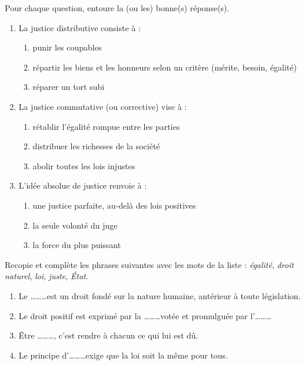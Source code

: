 \documentclass[11pt]{article}
\begin{document}
\begin{exercice}[QCM]
Pour chaque question, entoure la (ou les) bonne(s) réponse(s).
\begin{enumerate}
  \item La justice distributive consiste à :
  \begin{enumerate}
    \item[a)] punir les coupables
    \item[b)] répartir les biens et les honneurs selon un critère (mérite, besoin, égalité)
    \item[c)] réparer un tort subi
  \end{enumerate}
  \item La justice commutative (ou corrective) vise à :
  \begin{enumerate}
    \item[a)] rétablir l'égalité rompue entre les parties
    \item[b)] distribuer les richesses de la société
    \item[c)] abolir toutes les lois injustes
  \end{enumerate}
  \item L'idée absolue de justice renvoie à :
  \begin{enumerate}
    \item[a)] une justice parfaite, au-delà des lois positives
    \item[b)] la seule volonté du juge
    \item[c)] la force du plus puissant
  \end{enumerate}
\end{enumerate}
\end{exercice}

\begin{exercice}[Complétion]
Recopie et complète les phrases suivantes avec les mots de la liste : \emph{égalité}, \emph{droit naturel}, \emph{loi}, \emph{juste}, \emph{État}.
\begin{enumerate}
  \item Le \ldots\ldots\ldots est un droit fondé sur la nature humaine, antérieur à toute législation.
  \item Le droit positif est exprimé par la \ldots\ldots\ldots votée et promulguée par l'\ldots\ldots\ldots
  \item Être \ldots\ldots\ldots, c'est rendre à chacun ce qui lui est dû.
  \item Le principe d'\ldots\ldots\ldots exige que la loi soit la même pour tous.
\end{enumerate}
\end{exercice}
\end{document}
